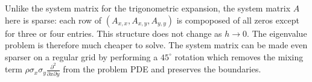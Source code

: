 \documentclass[10pt]{article}
\begin{document}
Unlike the system matrix for the trigonometric expansion, the system
matrix $A$ here is sparse: each row of $(A_{x,x}, A_{x,y}, A_{y,y})$
is compoposed of all zeros except for three or four entries. This
structure does not change as $h \to 0$. The eigenvalue problem is
therefore much cheaper to solve. The system matrix can be made even
sparser on a regular grid by performing a $45^{\circ}$ rotation which
removes the mixing term
$\rho\sigma_x \sigma_y\frac{\partial^2}{\partial x \partial y}$ from
the problem PDE and preserves the boundaries.


\end{document}
